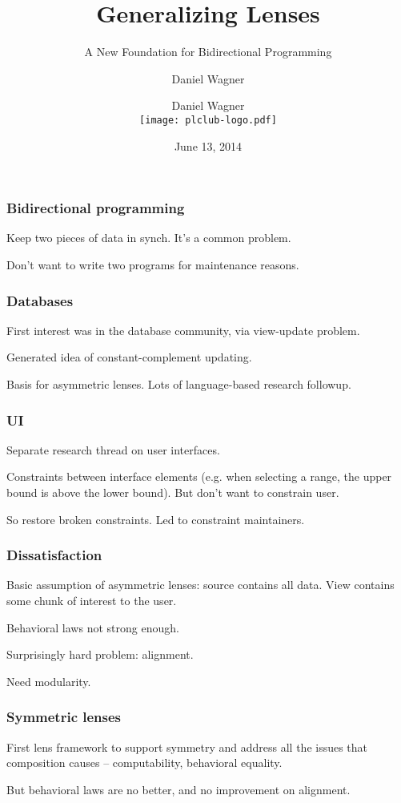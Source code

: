 \documentclass{beamer}
\title{Generalizing Lenses}
\subtitle{A New Foundation for Bidirectional Programming}
\author{Daniel Wagner} %
\date{June 13, 2014}
\begin{document}
\author{Daniel Wagner\\[3ex]\texttt{[image: plclub-logo.pdf]}} %
\maketitle

\begin{frame}
    \frametitle{Bidirectional programming}
    Keep two pieces of data in synch. It's a common problem.

    Don't want to write two programs for maintenance reasons.
\end{frame}

\begin{frame}
    \frametitle{Databases}
    First interest was in the database community, via view-update problem.

    Generated idea of constant-complement updating.

    Basis for asymmetric lenses. Lots of language-based research followup.
\end{frame}

\begin{frame}
    \frametitle{UI}
    Separate research thread on user interfaces.

    Constraints between interface elements (e.g. when selecting a range, the
    upper bound is above the lower bound). But don't want to constrain user.

    So restore broken constraints. Led to constraint maintainers.
\end{frame}

\begin{frame}
    \frametitle{Dissatisfaction}
    Basic assumption of asymmetric lenses: source contains all data. View
    contains some chunk of interest to the user.

    Behavioral laws not strong enough.

    Surprisingly hard problem: alignment.

    Need modularity.
\end{frame}

\begin{frame}
    \frametitle{Symmetric lenses}
    First lens framework to support symmetry and address all the issues that
    composition causes -- computability, behavioral equality.

    But behavioral laws are no better, and no improvement on alignment.
\end{frame}
\end{document}
